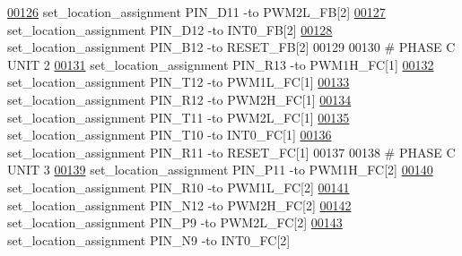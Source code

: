\begin{DoxyCode}
\hypertarget{_d_e0___n_a_n_o___v_f_8qsf_source_l00126}{}\hyperlink{_d_e0___n_a_n_o___v_f_8qsf_a64c40979a1c17395742f9641cfa857a9}{00126} set\_location\_assignment PIN\_D11 -to PWM2L\_FB[2]
\hypertarget{_d_e0___n_a_n_o___v_f_8qsf_source_l00127}{}\hyperlink{_d_e0___n_a_n_o___v_f_8qsf_a3095f7bf26e5a9f6c62b65b8504a9601}{00127} set\_location\_assignment PIN\_D12 -to INT0\_FB[2]
\hypertarget{_d_e0___n_a_n_o___v_f_8qsf_source_l00128}{}\hyperlink{_d_e0___n_a_n_o___v_f_8qsf_a38f710bb32001a801fef1626902ac5c4}{00128} set\_location\_assignment PIN\_B12 -to RESET\_FB[2]
00129 
00130 \textcolor{keyword}{# PHASE C UNIT 2}
\hypertarget{_d_e0___n_a_n_o___v_f_8qsf_source_l00131}{}\hyperlink{_d_e0___n_a_n_o___v_f_8qsf_a8c8384b39d0ab4865a2b5013a36c45d0}{00131} set\_location\_assignment PIN\_R13 -to PWM1H\_FC[1]
\hypertarget{_d_e0___n_a_n_o___v_f_8qsf_source_l00132}{}\hyperlink{_d_e0___n_a_n_o___v_f_8qsf_a3b0d58683986326367e12b54a694623b}{00132} set\_location\_assignment PIN\_T12 -to PWM1L\_FC[1]
\hypertarget{_d_e0___n_a_n_o___v_f_8qsf_source_l00133}{}\hyperlink{_d_e0___n_a_n_o___v_f_8qsf_acc3a7a7e59ba042c36031fa0d381b433}{00133} set\_location\_assignment PIN\_R12 -to PWM2H\_FC[1]
\hypertarget{_d_e0___n_a_n_o___v_f_8qsf_source_l00134}{}\hyperlink{_d_e0___n_a_n_o___v_f_8qsf_a3a8f144a9402a477710f3174a2ffe6f2}{00134} set\_location\_assignment PIN\_T11 -to PWM2L\_FC[1]
\hypertarget{_d_e0___n_a_n_o___v_f_8qsf_source_l00135}{}\hyperlink{_d_e0___n_a_n_o___v_f_8qsf_a8d1a5116a5b62a532e1b19ff5035c4bc}{00135} set\_location\_assignment PIN\_T10 -to INT0\_FC[1]
\hypertarget{_d_e0___n_a_n_o___v_f_8qsf_source_l00136}{}\hyperlink{_d_e0___n_a_n_o___v_f_8qsf_a697bfab3ec6ef3c41985b1f9328f94f4}{00136} set\_location\_assignment PIN\_R11 -to RESET\_FC[1]
00137 
00138 \textcolor{keyword}{# PHASE C UNIT 3}
\hypertarget{_d_e0___n_a_n_o___v_f_8qsf_source_l00139}{}\hyperlink{_d_e0___n_a_n_o___v_f_8qsf_a9c6132fb29762d1d809aa3f2ae7b86d0}{00139} set\_location\_assignment PIN\_P11 -to PWM1H\_FC[2]
\hypertarget{_d_e0___n_a_n_o___v_f_8qsf_source_l00140}{}\hyperlink{_d_e0___n_a_n_o___v_f_8qsf_a60080f3880b1b2249d9b0cbe5b1ca824}{00140} set\_location\_assignment PIN\_R10 -to PWM1L\_FC[2]
\hypertarget{_d_e0___n_a_n_o___v_f_8qsf_source_l00141}{}\hyperlink{_d_e0___n_a_n_o___v_f_8qsf_a2f5c435fa06be87f19b9ed98dbc9a343}{00141} set\_location\_assignment PIN\_N12 -to PWM2H\_FC[2]
\hypertarget{_d_e0___n_a_n_o___v_f_8qsf_source_l00142}{}\hyperlink{_d_e0___n_a_n_o___v_f_8qsf_a239d241a8eba8b24852967864b9ca57a}{00142} set\_location\_assignment PIN\_P9 -to PWM2L\_FC[2]
\hypertarget{_d_e0___n_a_n_o___v_f_8qsf_source_l00143}{}\hyperlink{_d_e0___n_a_n_o___v_f_8qsf_aedb0716cbd99e67785d0af3b48e3469f}{00143} set\_location\_assignment PIN\_N9 -to INT0\_FC[2]

\end{DoxyCode}
